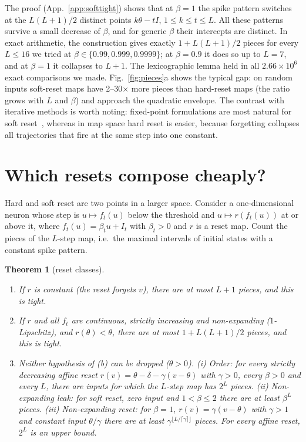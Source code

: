 \documentclass[10pt]{article}
\newtheorem{theorem}{Theorem}
\theoremstyle{remark}
\begin{document}
The proof (App.~\ref{app:softtight}) shows that at $\beta=1$ the spike pattern switches at the $L(L+1)/2$ distinct points $k\theta-tI$, $1\le k\le t\le L$. All these patterns survive a small decrease of $\beta$, and for generic $\beta$ their intercepts are distinct. In exact arithmetic, the construction gives exactly $1+L(L+1)/2$ pieces for every $L\le16$ we tried at $\beta\in\{0.99,0.999,0.9999\}$; at $\beta=0.9$ it does so up to $L=7$, and at $\beta=1$ it collapses to $L+1$. The lexicographic lemma held in all $2.66\times10^6$ exact comparisons we made. Fig.~\ref{fig:pieces}a shows the typical gap: on random inputs soft-reset maps have 2--30$\times$ more pieces than hard-reset maps (the ratio grows with $L$ and $\beta$) and approach the quadratic envelope.
The contrast with iterative methods is worth noting: fixed-point formulations are most natural for soft reset~\citep{feng2025fpt}, whereas in map space hard reset is easier, because forgetting collapses all trajectories that fire at the same step into one constant.

\section{Which resets compose cheaply?}
\label{sec:classes}

Hard and soft reset are two points in a larger space. Consider a one-dimensional neuron whose step is $u\mapsto f_t(u)$ below the threshold and $u\mapsto r(f_t(u))$ at or above it, where $f_t(u)=\beta_tu+I_t$ with $\beta_t>0$ and $r$ is a reset map. Count the pieces of the $L$-step map, i.e.\ the maximal intervals of initial states with a constant spike pattern.

\begin{theorem}[reset classes]
\label{thm:classes}
\begin{enumerate}[label=(\alph*),leftmargin=*]
\item If $r$ is constant (the reset forgets $v$), there are at most $L+1$ pieces, and this is tight.
\item If $r$ and all $f_t$ are continuous, strictly increasing and non-expanding ($1$-Lipschitz), and $r(\theta)<\theta$, there are at most $1+L(L+1)/2$ pieces, and this is tight.
\item Neither hypothesis of (b) can be dropped ($\theta>0$). (i) \emph{Order:} for every strictly decreasing affine reset $r(v)=\theta-\delta-\gamma(v-\theta)$ with $\gamma>0$, every $\beta>0$ and every $L$, there are inputs for which the $L$-step map has $2^L$ pieces. (ii) \emph{Non-expanding leak:} for soft reset, zero input and $1<\beta\le2$ there are at least $\beta^L$ pieces. (iii) \emph{Non-expanding reset:} for $\beta=1$, $r(v)=\gamma(v-\theta)$ with $\gamma>1$ and constant input $\theta/\gamma$ there are at least $\gamma^{\lfloor L/\lceil\gamma\rceil\rfloor}$ pieces. For every affine reset, $2^L$ is an upper bound.
\end{enumerate}
\end{theorem}
\end{document}
